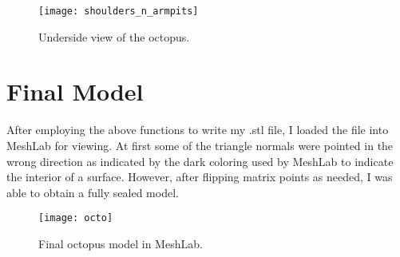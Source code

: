 \documentclass[twocolumn]{article}
\begin{document}
\begin{figure}[h!]
\begin{center}
\texttt{[image: shoulders\_n\_armpits]}
\caption{Underside view of the octopus.}
\end{center}
\end{figure}

\section{Final Model}

After employing the above functions to write my .stl file, I loaded the file into MeshLab for viewing. At first some of the triangle normals were pointed in the wrong direction as indicated by the dark coloring used by MeshLab to indicate the interior of a surface. However, after flipping matrix points as needed, I was able to obtain a fully sealed model. 

\begin{figure}[h!]
\begin{center}
\texttt{[image: octo]}
\caption{Final octopus model in MeshLab.}
\end{center}
\end{figure}
\end{document}
